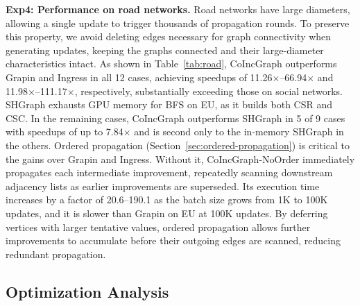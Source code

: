 \textbf{Exp4: Performance on road networks.} Road networks have large diameters, allowing a single update to trigger thousands of propagation rounds. To preserve this property, we avoid deleting edges necessary for graph connectivity when generating updates, keeping the graphs connected and their large-diameter characteristics intact. As shown in Table~\ref{tab:road}, CoIncGraph outperforms Grapin and Ingress in all 12 cases, achieving speedups of 11.26$\times$--66.94$\times$ and 11.98$\times$--111.17$\times$, respectively, substantially exceeding those on social networks. SHGraph exhausts GPU memory for BFS on EU, as it builds both CSR and CSC. In the remaining cases, CoIncGraph outperforms SHGraph in 5 of 9 cases with speedups of up to 7.84$\times$ and is second only to the in-memory SHGraph in the others. Ordered propagation (Section~\ref{sec:ordered-propagation}) is critical to the gains over Grapin and Ingress. Without it, CoIncGraph-NoOrder immediately propagates each intermediate improvement, repeatedly scanning downstream adjacency lists as earlier improvements are superseded. Its execution time increases by a factor of 20.6--190.1 as the batch size grows from 1K to 100K updates, and it is slower than Grapin on EU at 100K updates. By deferring vertices with larger tentative values, ordered propagation allows further improvements to accumulate before their outgoing edges are scanned, reducing redundant propagation.


\subsection{Optimization Analysis}

